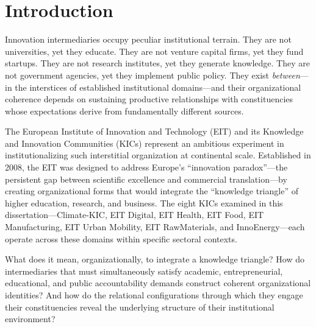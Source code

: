 \documentclass[../main.tex]{subfiles}
\begin{document}
\section{Introduction}

Innovation intermediaries occupy peculiar institutional terrain. They are not universities, yet they educate. They are not venture capital firms, yet they fund startups. They are not research institutes, yet they generate knowledge. They are not government agencies, yet they implement public policy. They exist \textit{between}---in the interstices of established institutional domains---and their organizational coherence depends on sustaining productive relationships with constituencies whose expectations derive from fundamentally different sources.

The European Institute of Innovation and Technology (EIT) and its Knowledge and Innovation Communities (KICs) represent an ambitious experiment in institutionalizing such interstitial organization at continental scale. Established in 2008, the EIT was designed to address Europe's ``innovation paradox''---the persistent gap between scientific excellence and commercial translation---by creating organizational forms that would integrate the ``knowledge triangle'' of higher education, research, and business. The eight KICs examined in this dissertation---Climate-KIC, EIT Digital, EIT Health, EIT Food, EIT Manufacturing, EIT Urban Mobility, EIT RawMaterials, and InnoEnergy---each operate across these domains within specific sectoral contexts.

What does it mean, organizationally, to integrate a knowledge triangle? How do intermediaries that must simultaneously satisfy academic, entrepreneurial, educational, and public accountability demands construct coherent organizational identities? And how do the relational configurations through which they engage their constituencies reveal the underlying structure of their institutional environment?
\end{document}
